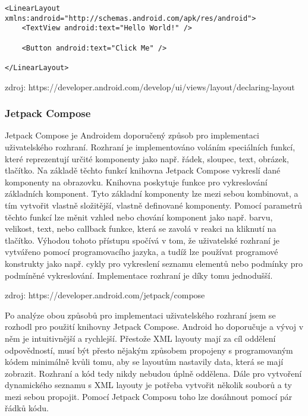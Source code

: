 \begin{lstlisting}[caption={XML layout vykreslující vedle sebe text a tlačítko.}, label={lst:xml-layout}]
<LinearLayout xmlns:android="http://schemas.android.com/apk/res/android">
	<TextView android:text="Hello World!" />

	<Button	android:text="Click Me" />

</LinearLayout>
\end{lstlisting}

zdroj: https://developer.android.com/develop/ui/views/layout/declaring-layout

\subsubsection*{Jetpack Compose}
\label{sssec:jetpack-compose}
Jetpack Compose je Androidem doporučený způsob pro implementaci uživatelského rozhraní. Rozhraní je implementováno voláním speciálních funkcí, které reprezentují určité komponenty jako např. řádek, sloupec, text, obrázek, tlačítko. Na základě těchto funkcí knihovna Jetpack Compose vykreslí dané komponenty na obrazovku. Knihovna poskytuje funkce pro vykreslování základních komponent. Tyto základní komponenty lze mezi sebou kombinovat, a tím vytvořit vlastně složitější, vlastně definované komponenty.  Pomocí parametrů těchto funkcí lze měnit vzhled nebo chování komponent jako např. barvu, velikost, text, nebo callback funkce, která se zavolá v reakci na kliknutí na tlačítko. Výhodou tohoto přístupu spočívá v tom, že uživatelské rozhraní je vytvářeno pomocí programovacího jazyka, a tudíž lze používat programové konstrukty jako např. cykly pro vykreslení seznamu elementů nebo podmínky pro podmíněné vykreslování. Implementace rozhraní je díky tomu jednodušší.

zdroj: https://developer.android.com/jetpack/compose

\vspace*{10px}
\noindent Po analýze obou způsobů pro implementaci uživatelského rozhraní jsem se rozhodl pro použití knihovny Jetpack Compose. Android ho doporučuje a vývoj v něm je intuitivnější a rychlejší. Přestože XML layouty mají za cíl oddělení odpovědností, musí být přesto nějakým způsobem propojeny s programovaným kódem minimálně kvůli tomu, aby se layoutům nastavily data, která se mají zobrazit. Rozhraní a kód tedy nikdy nebudou úplně oddělena. Dále pro vytvoření dynamického seznamu s XML layouty je potřeba vytvořit několik souborů a ty mezi sebou propojit. Pomocí Jetpack Composu toho lze dosáhnout pomocí pár řádků kódu.

